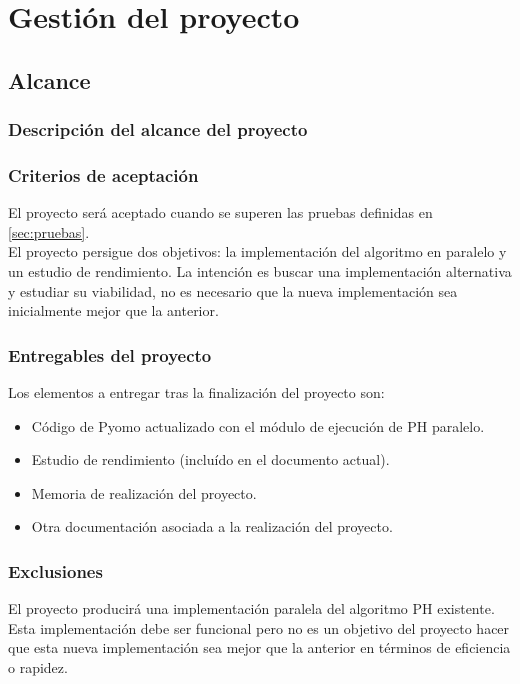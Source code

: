 \chapter{Gestión del proyecto}

\section{Alcance}

\subsection{Descripción del alcance del proyecto}

\subsection{Criterios de aceptación}

El proyecto será aceptado cuando se superen las pruebas definidas en \autoref{sec:pruebas}.\\

El proyecto persigue dos objetivos: la implementación del algoritmo en paralelo y un estudio de rendimiento. La intención es buscar una implementación alternativa y estudiar su viabilidad, no es necesario que la nueva implementación sea inicialmente mejor que la anterior.

\subsection{Entregables del proyecto}

Los elementos a entregar tras la finalización del proyecto son:

\begin{itemize}
    \item Código de Pyomo actualizado con el módulo de ejecución de PH paralelo.
    \item Estudio de rendimiento (incluído en el documento actual).
    \item Memoria de realización del proyecto.
    \item Otra documentación asociada a la realización del proyecto.
\end{itemize}

\subsection{Exclusiones}

El proyecto producirá una implementación paralela del algoritmo PH existente. Esta implementación debe ser funcional pero no es un objetivo del proyecto hacer que esta nueva implementación sea mejor que la anterior en términos de eficiencia o rapidez.

